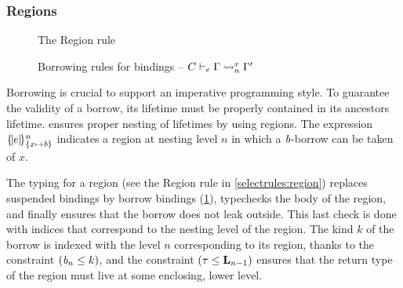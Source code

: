 \subsubsection{Regions}
\label{sdtyping:regions}
\begin{figure}[tp]
  \begin{minipage}{0.4\linewidth}
    \centering
    \begin{mathpar}
    \end{mathpar}
    \caption{The {\sc Region} rule}
    \label{selectrules:region}
  \end{minipage}\hfill
  \begin{minipage}{0.6\linewidth}
    \centering


    \begin{mathpar}
    \end{mathpar}
    \caption{Borrowing rules for bindings -- $\lregion{C}{x}{\E}{\E'}$}
    \label{env:rule:borrow}
  \end{minipage}
\end{figure}

Borrowing is crucial to support an imperative programming style.
To guarantee the validity of a borrow, its lifetime must be properly contained in its
ancestors lifetime. \lang ensures proper nesting of lifetimes by using
regions. The expression $\region{\Sone x\BORROW}{e}$ indicates a 
region at nesting level $n$ in which a $\BORROW$-borrow can be taken of $x$.

The typing for a region (see the {\sc Region} rule in \cref{selectrules:region})
replaces suspended bindings by borrow bindings
(\cref{env:rule:borrow}), typechecks the body 
of the region, and finally ensures that the borrow does not leak outside.
This last check is done with indices that correspond to the nesting
level of the region. The kind $k$ of the borrow is indexed with the level $n$
corresponding to its region, thanks to the constraint $(\BORROW_n\lk
k)$, and the constraint $\Cleq{\tau}{\klin_{n-1}}$ ensures that 
the return type of the region must live at some enclosing, lower level.

